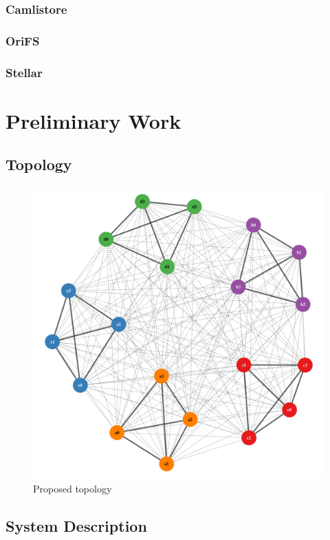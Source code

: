 \documentclass{article}
\begin{document}
\subsubsection{Camlistore}

\subsubsection{OriFS}

\subsubsection{Stellar}

\section{Preliminary Work}

\subsection{Topology}

\begin{figure}[!h]
    \centering
        \includegraphics[width=.9\textwidth]{figures/topology}
        \caption{Proposed topology}
        \label{fig:topology}
\end{figure}

\subsection{System Description}
\end{document}
